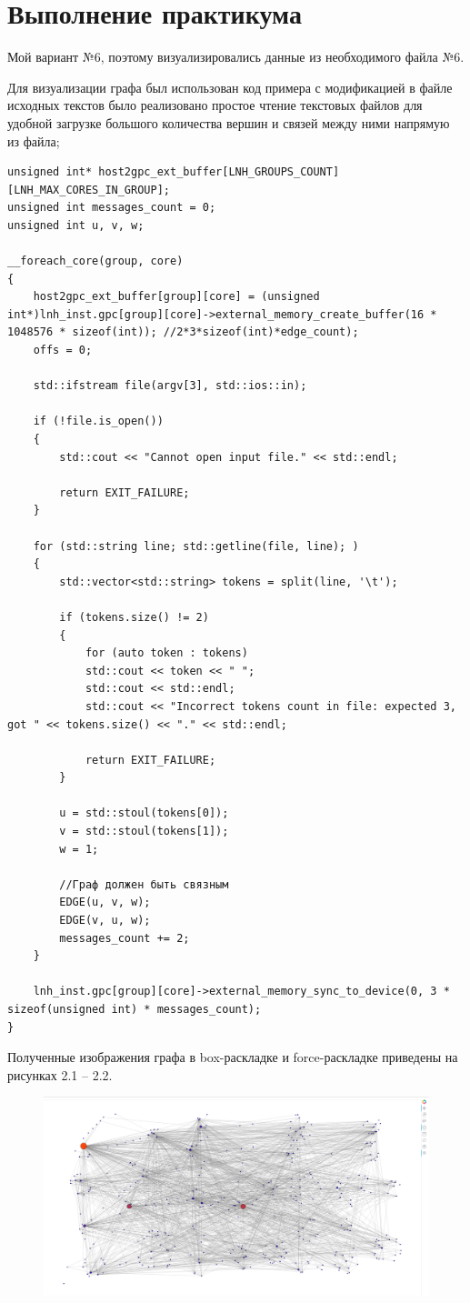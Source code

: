 \chapter{Выполнение практикума}

Мой вариант №6, поэтому визуализировались данные из необходимого файла №6.

Для визуализации графа был использован код примера с модификацией в файле исходных текстов было реализовано простое чтение текстовых файлов для удобной загрузке большого количества вершин и связей между ними напрямую из файла;
\begin{lstlisting}[label=host, caption={Модификация файла host\_main.cpp}]
 unsigned int* host2gpc_ext_buffer[LNH_GROUPS_COUNT][LNH_MAX_CORES_IN_GROUP];
unsigned int messages_count = 0;
unsigned int u, v, w;

__foreach_core(group, core)
{
	host2gpc_ext_buffer[group][core] = (unsigned int*)lnh_inst.gpc[group][core]->external_memory_create_buffer(16 * 1048576 * sizeof(int)); //2*3*sizeof(int)*edge_count);
	offs = 0;
	
	std::ifstream file(argv[3], std::ios::in);
	
	if (!file.is_open())
	{
		std::cout << "Cannot open input file." << std::endl;
		
		return EXIT_FAILURE;
	}
	
	for (std::string line; std::getline(file, line); )
	{
		std::vector<std::string> tokens = split(line, '\t');
		
		if (tokens.size() != 2)
		{
			for (auto token : tokens)
			std::cout << token << " ";
			std::cout << std::endl;
			std::cout << "Incorrect tokens count in file: expected 3, got " << tokens.size() << "." << std::endl;
			
			return EXIT_FAILURE;
		}
		
		u = std::stoul(tokens[0]);
		v = std::stoul(tokens[1]);
		w = 1;
		
		//Граф должен быть связным
		EDGE(u, v, w);
		EDGE(v, u, w);
		messages_count += 2;
	}
	
	lnh_inst.gpc[group][core]->external_memory_sync_to_device(0, 3 * sizeof(unsigned int) * messages_count);
}
\end{lstlisting}
Полученные изображения графа в box-раскладке и force-раскладке приведены на рисунках 2.1 -- 2.2.
\begin{figure}[H]
	\centering
	\includegraphics[width=1\linewidth]{box}
	\caption{}
	\label{fig:box}
\end{figure}

